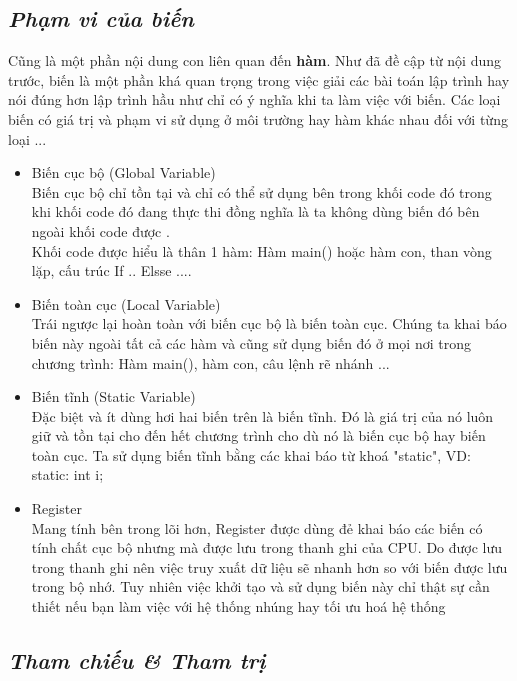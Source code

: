\documentclass[12pt,a4paper]{article}
\begin{document}
\begin{center}
\subsection*{\textit{Phạm vi của biến}} 	
\end{center}
Cũng là một phần nội dung con liên quan đến \textbf{hàm}. Như đã đề cập từ nội dung trước, biến là một phần khá quan trọng trong việc giải các bài toán lập trình hay nói đúng hơn lập trình hầu như chỉ có ý nghĩa khi ta làm việc với biến. Các loại biến có giá trị và phạm vi sử dụng ở môi trường hay hàm khác nhau đối với từng loại ...
\begin{itemize}
	\item Biến cục bộ (Global Variable)\\
Biến cục bộ chỉ tồn tại và chỉ có thể sử dụng bên trong khối code đó trong khi khối code đó đang thực thi đồng nghĩa là ta không dùng biến đó bên ngoài khối code được . \\Khối code được hiểu là thân 1 hàm: Hàm main() hoặc hàm con, than vòng lặp, cấu trúc If .. Elsse ....
	\item Biến toàn cục (Local Variable)\\
Trái ngược lại hoàn toàn với biến cục bộ là biến toàn cục. Chúng ta khai báo biến này ngoài tất cả các hàm và cũng sử dụng biến đó ở mọi nơi trong chương trình: Hàm main(), hàm con, câu lệnh rẽ nhánh ...
	\item Biến tĩnh (Static Variable)\\
Đặc biệt và ít dùng hơi hai biến trên là biến tĩnh. Đó là giá trị của nó luôn giữ và tồn tại cho đến hết chương trình cho dù nó là biến cục bộ hay biến toàn cục. Ta sử dụng biến tĩnh bằng các khai báo từ khoá "static", VD: static: int i;
	\item Register\\
Mang tính bên trong lõi hơn, Register được dùng đẻ khai báo các biến có tính chất cục bộ nhưng mà được lưu trong thanh ghi của CPU. Do được lưu trong thanh ghi nên việc truy xuất dữ liệu sẽ nhanh hơn so với biến được lưu trong bộ nhớ. Tuy nhiên việc khởi tạo và sử dụng biến này chỉ thật sự cần thiết nếu bạn làm việc với hệ thống nhúng hay tối ưu hoá hệ thống 
\end{itemize}
\begin{center}
	\subsection*{\textit{Tham chiếu \& Tham trị}}
\end{center}
\end{document}
